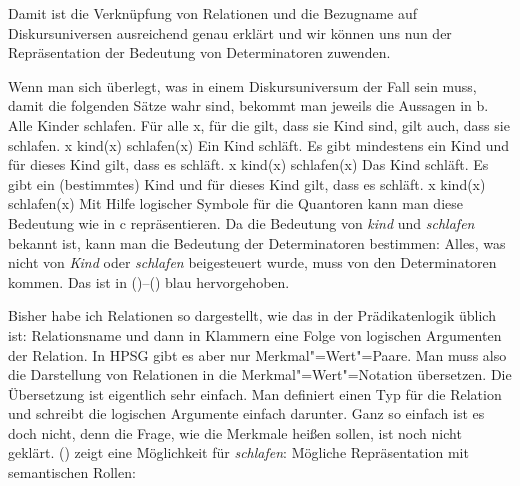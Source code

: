 Damit ist die Verknüpfung von Relationen und die Bezugname auf Diskursuniversen ausreichend genau
erklärt und wir können uns nun der Repräsentation der Bedeutung von Determinatoren zuwenden.

Wenn man sich überlegt, was in einem Diskursuniversum der Fall sein muss, damit die folgenden Sätze
wahr sind, bekommt man jeweils die Aussagen in b.
\eal
\label{ex-Alle-Kinder-schlafen}
\ex Alle Kinder schlafen.
\ex Für alle x, für die gilt, dass sie Kind sind, gilt auch, dass sie schlafen.
\ex \blau{$\forall$}x kind(x) \blau{$\to$} schlafen(x)
\zl
\eal
\ex Ein Kind schläft.
\ex Es gibt mindestens ein Kind und für dieses Kind gilt, dass es schläft.
\ex \blau{$\exists$}x kind(x) \blau{$\wedge$} schlafen(x)
\zl
\eal
\label{ex-Das-Kind-schläft}
\ex Das Kind schläft.
\ex Es gibt ein (bestimmtes) Kind und für dieses Kind gilt, dass es schläft.
\ex \blau{$\iota$}x kind(x) \blau{$\wedge$} schlafen(x)
\zl
Mit Hilfe logischer Symbole für die Quantoren kann man diese Bedeutung wie in c repräsentieren. Da
die Bedeutung von \emph{kind} und \emph{schlafen} bekannt ist, kann man die Bedeutung der
Determinatoren bestimmen: Alles, was nicht von \emph{Kind} oder \emph{schlafen} beigesteuert wurde,
muss von den Determinatoren kommen. Das ist in ()--() blau hervorgehoben.


Bisher habe ich Relationen so dargestellt, wie das in der Prädikatenlogik üblich ist: Relationsname
und dann in Klammern eine Folge von logischen Argumenten der Relation. In HPSG gibt es aber nur
Merkmal"=Wert"=Paare. Man muss also die Darstellung von Relationen in die Merkmal"=Wert"=Notation
übersetzen. Die Übersetzung ist eigentlich sehr einfach. Man definiert einen Typ für die Relation
und schreibt die logischen Argumente einfach darunter. Ganz so einfach ist es doch nicht, denn die
Frage, wie die Merkmale heißen sollen, ist noch nicht geklärt. () zeigt eine Möglichkeit für \emph{schlafen}:
\ea
Mögliche Repräsentation mit semantischen Rollen:\\
\z

